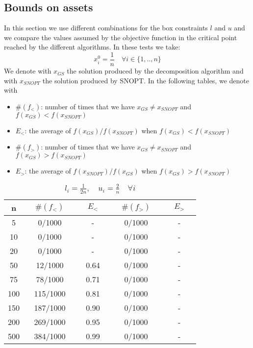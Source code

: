 \subsection{Bounds on assets}\label{bounded}
In this section we use different combinations for the box constraints $l$ and $u$ and we compare the values assumed by the objective function in the critical point reached by the different algorithms. In these tests we take:
\begin{equation}
x_i^0 = \frac{1}{n} \quad \forall i \in \{1, .., n \}
\end{equation}
We denote with $x_{GS}$ the solution produced by the decomposition algorithm and with $x_{SNOPT}$ the solution produced by SNOPT. In the following tables, we denote with
\begin{itemize}
\item $\#(f_{<})$: number of times that we have $x_{GS} \neq x_{SNOPT}$ and $f(x_{GS}) < f(x_{SNOPT})$
\item $E_{<}$: the average of $f(x_{GS})/f(x_{SNOPT})$ when $f(x_{GS}) < f(x_{SNOPT})$
\item $\#(f_{>})$: number of times that we have $x_{GS} \neq x_{SNOPT}$ and $f(x_{GS}) > f(x_{SNOPT})$
\item $E_{>}$: the average of $f(x_{SNOPT})/f(x_{GS})$ when $f(x_{GS}) > f(x_{SNOPT})$
\end{itemize}

\begin{table}
\begin{center}
\begin{tabular}{ c | c | c | c | c}
n &  $\quad \#(f_<) \quad$ & $\quad E_< \quad$ &  $\quad \#(f_>) \quad$ & $ \quad E_> \quad$  \\\hline
5 & 0/1000     & - & 0/1000 & -     \\\hline
10 & 0/1000    & -   & 0/1000 & -        \\\hline
20 & 0/1000    & -   & 0/1000 & -        \\\hline
50 & 12/1000   & 0.64 & 0/1000 & -       \\\hline
75 & 78/1000  & 0.71  & 0/1000 & -      \\\hline
100 & 115/1000 & 0.81  & 0/1000 & -      \\\hline
150 & 187/1000 & 0.90 & 0/1000 & -       \\\hline
200 & 269/1000 & 0.95 & 0/1000 & -       \\\hline
500 & 384/1000 & 0.99 & 0/1000 & -     \\\hline
\end{tabular}
\caption{$l_i = \frac{1}{2n}, \quad u_i = \frac{2}{n} \quad \forall i$}
\label{tab:results1}
\end{center}
\end{table}

